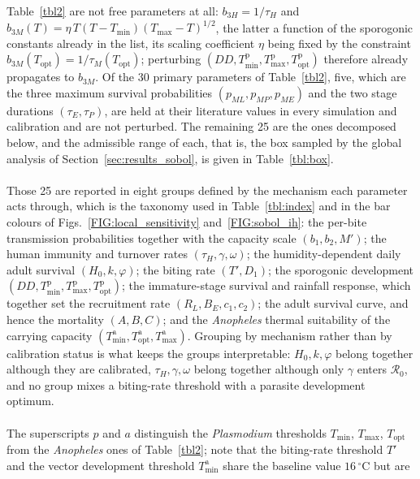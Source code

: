 \documentclass[a4paper,fleqn]{cas-dc}
\begin{document}
Table~\ref{tbl2} are not free parameters at all: $b_{3H}=1/\tau_H$ and
$b_{3M}(T)=\eta\,T(T-T_{\min})(T_{\max}-T)^{1/2}$, the latter a function of
the sporogonic constants already in the list, its scaling coefficient $\eta$
being fixed by the constraint
$b_{3M}(T_{\mathrm{opt}})=1/\tau_M(T_{\mathrm{opt}})$; perturbing
$(DD, T_{\min}^{\mathrm{p}}, T_{\max}^{\mathrm{p}}, T_{\mathrm{opt}}^{\mathrm{p}})$
therefore already propagates to $b_{3M}$. Of the 30 primary parameters of
Table~\ref{tbl2}, five, which are the three maximum survival probabilities
$(p_{ML}, p_{MP}, p_{ME})$ and the two stage durations $(\tau_E, \tau_P)$, are
held at their literature values in every simulation and calibration and are
not perturbed. The remaining 25 are the ones decomposed below, and the
admissible range of each, that is, the box sampled by the global analysis of
Section~\ref{sec:results_sobol}, is given in Table~\ref{tbl:box}.
\\\\
Those 25 are reported in eight groups defined by the mechanism each parameter
acts through, which is the taxonomy used in Table~\ref{tbl:index} and in the bar
colours of Figs.~\ref{FIG:local_sensitivity} and~\ref{FIG:sobol_ih}: the
per-bite transmission probabilities together with the capacity scale
$(b_1, b_2, M')$; the human immunity and turnover rates
$(\tau_H, \gamma, \omega)$; the humidity-dependent daily adult survival
$(H_0, k, \varphi)$; the biting rate $(T', D_1)$; the sporogonic development
$(DD, T_{\min}^{\mathrm{p}}, T_{\max}^{\mathrm{p}}, T_{\mathrm{opt}}^{\mathrm{p}})$;
the immature-stage survival and rainfall response, which together set the
recruitment rate $(R_L, B_E, c_1, c_2)$; the adult survival curve, and hence the
mortality $(A, B, C)$; and the \textit{Anopheles} thermal suitability of the
carrying capacity
$(T_{\min}^{\mathrm{a}}, T_{\mathrm{opt}}^{\mathrm{a}}, T_{\max}^{\mathrm{a}})$.
Grouping by mechanism rather than by calibration status is what keeps the
groups interpretable: $H_0, k, \varphi$ belong together although they are
calibrated, $\tau_H, \gamma, \omega$ belong together although only $\gamma$
enters $\mathcal{R}_0$, and no group mixes a biting-rate threshold with a
parasite development optimum.
\\\\
The superscripts $p$ and $a$
distinguish the \textit{Plasmodium} thresholds $T_{\min}$, $T_{\max}$,
$T_{\mathrm{opt}}$ from the \textit{Anopheles} ones of Table~\ref{tbl2}; note
that the biting-rate threshold $T'$ and the vector development threshold
$T_{\min}^{\mathrm{a}}$ share the baseline value $16\,^{\circ}\mathrm{C}$ but are
\end{document}
